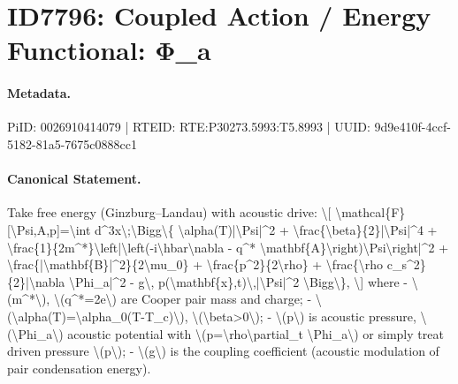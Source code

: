 \section*{ID7796: Coupled Action / Energy Functional: Φ\_a}
\paragraph{Metadata.}
PiID: 0026910414079 | RTEID: RTE:P30273.5993:T5.8993 | UUID: 9d9e410f-4ccf-5182-81a5-7675c0888cc1

\paragraph{Canonical Statement.}
Take free energy (Ginzburg–Landau) with acoustic drive: \textbackslash{}[ \textbackslash{}mathcal\{F\}[\textbackslash{}Psi,A,p]=\textbackslash{}int d\textasciicircum{}3x\textbackslash{};\textbackslash{}Bigg\textbackslash{}\{ \textbackslash{}alpha(T)|\textbackslash{}Psi|\textasciicircum{}2 + \textbackslash{}frac\{\textbackslash{}beta\}\{2\}|\textbackslash{}Psi|\textasciicircum{}4 + \textbackslash{}frac\{1\}\{2m\textasciicircum{}*\}\textbackslash{}left|\textbackslash{}left(-i\textbackslash{}hbar\textbackslash{}nabla - q\textasciicircum{}* \textbackslash{}mathbf\{A\}\textbackslash{}right)\textbackslash{}Psi\textbackslash{}right|\textasciicircum{}2 + \textbackslash{}frac\{|\textbackslash{}mathbf\{B\}|\textasciicircum{}2\}\{2\textbackslash{}mu\_0\} + \textbackslash{}frac\{p\textasciicircum{}2\}\{2\textbackslash{}rho\} + \textbackslash{}frac\{\textbackslash{}rho c\_s\textasciicircum{}2\}\{2\}|\textbackslash{}nabla \textbackslash{}Phi\_a|\textasciicircum{}2 - g\textbackslash{}, p(\textbackslash{}mathbf\{x\},t)\textbackslash{},|\textbackslash{}Psi|\textasciicircum{}2 \textbackslash{}Bigg\textbackslash{}\}, \textbackslash{}] where - \textbackslash{}(m\textasciicircum{}*\textbackslash{}), \textbackslash{}(q\textasciicircum{}*=2e\textbackslash{}) are Cooper pair mass and charge; - \textbackslash{}(\textbackslash{}alpha(T)=\textbackslash{}alpha\_0(T-T\_c)\textbackslash{}), \textbackslash{}(\textbackslash{}beta>0\textbackslash{}); - \textbackslash{}(p\textbackslash{}) is acoustic pressure, \textbackslash{}(\textbackslash{}Phi\_a\textbackslash{}) acoustic potential with \textbackslash{}(p=\textbackslash{}rho\textbackslash{}partial\_t \textbackslash{}Phi\_a\textbackslash{}) or simply treat driven pressure \textbackslash{}(p\textbackslash{}); - \textbackslash{}(g\textbackslash{}) is the coupling coefficient (acoustic modulation of pair condensation energy).

